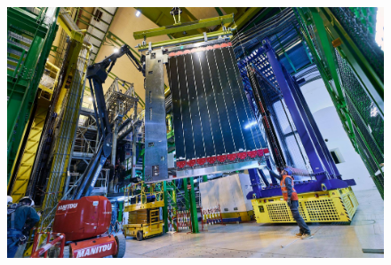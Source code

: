 \begin{frame}
     \begin{figure}[h]
        \centering
        \includegraphics[width=\textwidth]{Figures Introductory Lecture/LHCb Detector/LHCb_T1-3.jpg} %
        \end{figure}
\end{frame}
